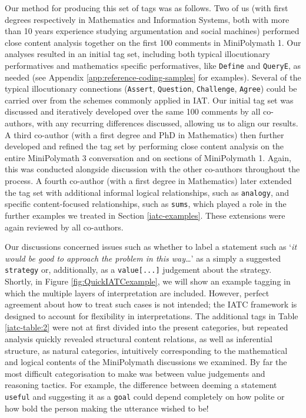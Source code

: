 \documentclass[smallextended,oneside]{svjour3}       %
\let\cite\citep
\newcommand\nothing[1]{#1}
\let\paragraph\nothing
\begin{document}
\paragraph{Our method for producing this set of tags was as follows.}
Two of us (with first degrees respectively in Mathematics and Information
Systems, both with more than 10 years experience studying
argumentation and social machines) performed close content analysis
\cite{klaus2004content} together on the first 100 comments in MiniPolymath
1.  Our analyses resulted in an initial tag set, including both typical
illocutionary performatives and mathematics specific performatives,
like \texttt{Define} and \texttt{QueryE}, as
needed (see Appendix \ref{app:reference-coding-samples} for examples).  Several
of the typical illocutionary connections (\texttt{Assert}, \texttt{Question}, \texttt{Challenge},
\texttt{Agree}) could be carried over from the schemes commonly applied in
IAT.  Our initial tag set was discussed and iteratively developed over
the same 100 comments by all co-authors, with any recurring
differences discussed, allowing us to align our results.  A third
co-author (with a first degree and PhD in Mathematics) then further
developed and refined the tag set by performing close content
analysis on the entire MiniPolymath 3 conversation and on sections of
MiniPolymath 1.  Again, this was conducted alongside discussion with
the other co-authors throughout the process.
A fourth co-author  (with a first degree in Mathematics)
later extended the tag set
with
additional informal logical relationships, such as \texttt{analogy}, and specific
content-focused relationships, such as \texttt{sums}, which played a
role in the further examples we treated in Section
\ref{iatc-examples}.  These extensions were again reviewed by all co-authors.

Our discussions concerned issues such as whether to label a statement such as
`\emph{it would be good to approach the problem in this way\ldots}'
as a simply a suggested \texttt{strategy} or, additionally, as a \texttt{value[...]} judgement
about the strategy.  Shortly, in Figure \ref{fig:QuickIATCexample}, we will
show an example tagging in which the multiple layers of interpretation are included.
However, perfect agreement about how to treat such
cases is not intended; the IATC framework is designed to account for
flexibility in interpretations.
The additional tags in Table \ref{iatc-table:2} were not at first
divided into the present categories, but repeated analysis quickly
revealed structural content relations, as well as inferential
structure, as natural categories, intuitively corresponding to the
mathematical and logical contents of the MiniPolymath discussions we examined.  By
far the most difficult categorisation to make was between value
judgements and reasoning tactics.  For example, the difference between
deeming a statement \texttt{useful} and suggesting it as a
\texttt{goal} could depend completely on how polite or how bold the
person making the utterance wished to be!
\end{document}
